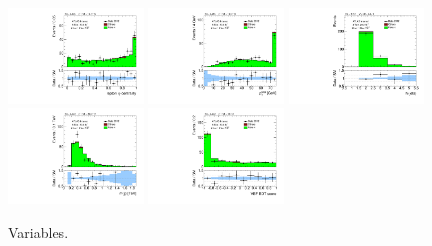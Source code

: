 \begin{figure}[tp]
  \includegraphics[width=0.32\textwidth]{figures/analysis/vbf-ZllCR/lep-eta-centrality}
  \includegraphics[width=0.32\textwidth]{figures/analysis/vbf-ZllCR/system-pt}
  \includegraphics[width=0.32\textwidth]{figures/analysis/vbf-ZllCR/n-jets30}
  \includegraphics[width=0.32\textwidth]{figures/analysis/vbf-ZllCR/dijet-m-veryhigh}
  \includegraphics[width=0.32\textwidth]{figures/analysis/vbf-ZllCR/BDTEve-VBF}
  \caption{Variables.}
  \label{fig:backgrounds-ZllCR-jets}
\end{figure}

